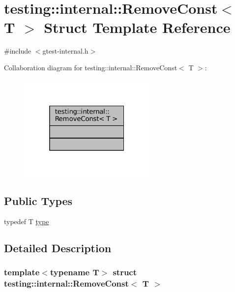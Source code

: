 \hypertarget{structtesting_1_1internal_1_1RemoveConst}{}\section{testing\+:\+:internal\+:\+:Remove\+Const$<$ T $>$ Struct Template Reference}
\label{structtesting_1_1internal_1_1RemoveConst}


{\ttfamily \#include $<$gtest-\/internal.\+h$>$}



Collaboration diagram for testing\+:\+:internal\+:\+:Remove\+Const$<$ T $>$\+:
\nopagebreak
\begin{figure}[H]
\begin{center}
\leavevmode
\includegraphics[width=193pt]{structtesting_1_1internal_1_1RemoveConst__coll__graph}
\end{center}
\end{figure}
\subsection*{Public Types}
\begin{DoxyCompactItemize}
\item 
typedef T \hyperlink{structtesting_1_1internal_1_1RemoveConst_a1be32027ea4edcc0d15abd59aba4a97f}{type}
\end{DoxyCompactItemize}


\subsection{Detailed Description}
\subsubsection*{template$<$typename T$>$\newline
struct testing\+::internal\+::\+Remove\+Const$<$ T $>$}



